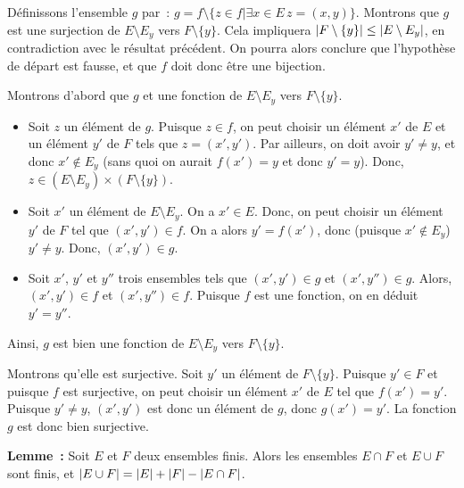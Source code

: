     Définissons l'ensemble $g$ par : $g = f \setminus \lbrace z \in f \vert \exists x \in E \, z = (x, y) \rbrace$. 
    Montrons que $g$ est une surjection de $E \setminus E_y$ vers $F \setminus \lbrace y \rbrace$. 
    Cela impliquera $\left\lvert F \setminus \lbrace y \rbrace \right\rvert \leq \left\lvert E \setminus E_y \right\rvert$, en contradiction avec le résultat précédent. 
    On pourra alors conclure que l'hypothèse de départ est fausse, et que $f$ doit donc être une bijection.
    
    Montrons d'abord que $g$ et une fonction de $E \setminus E_y$ vers $F \setminus \lbrace y \rbrace$.
    \begin{itemize}[nosep]
        \item Soit $z$ un élément de $g$. 
            Puisque $z \in f$, on peut choisir un élément $x'$ de $E$ et un élément $y'$ de $F$ tels que $z = (x',y')$.
            Par ailleurs, on doit avoir $y' \neq y$, et donc $x' \notin E_y$ (sans quoi on aurait $f(x') = y$ et donc $y' = y$). 
            Donc, $z \in \left( E \setminus E_y \right) \times \left( F \setminus \lbrace y \rbrace \right)$.
        \item Soit $x'$ un élément de $E \setminus E_y$. 
            On a $x' \in E$. 
            Donc, on peut choisir un élément $y'$ de $F$ tel que $(x',y') \in f$.
            On a alors $y' = f(x')$, donc (puisque $x' \notin E_y$) $y' \neq y$.
            Donc, $(x',y') \in g$.
        \item Soit $x'$, $y'$ et $y''$ trois ensembles tels que $(x', y') \in g$ et $(x', y'') \in g$. 
            Alors, $(x', y') \in f$ et $(x', y'') \in f$.
            Puisque $f$ est une fonction, on en déduit $y' = y''$.
    \end{itemize}
    Ainsi, $g$ est bien une fonction de $E \setminus E_y$ vers $F \setminus \lbrace y \rbrace$.

    Montrons qu'elle est surjective. 
    Soit $y'$ un élément de $F \setminus \lbrace y \rbrace$. 
    Puisque $y' \in F$ et puisque $f$ est surjective, on peut choisir un élément $x'$ de $E$ tel que $f(x') = y'$. 
    Puisque $y' \neq y$, $(x',y')$ est donc un élément de $g$, donc $g(x') = y'$. 
    La fonction $g$ est donc bien surjective.

    \done

\medskip

\noindent\textbf{Lemme :} Soit $E$ et $F$ deux ensembles finis. 
    Alors les ensembles $E \cap F$ et $E \cup F$ sont finis, et $\left\lvert E \cup F \right\rvert = \left\lvert E \right\rvert + \left\lvert F \right\rvert - \left\lvert E \cap F \right\rvert$.

